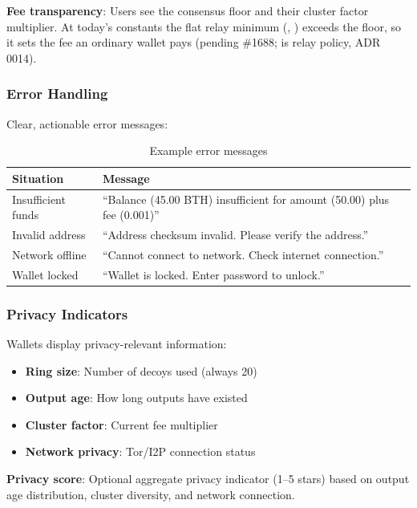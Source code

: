\textbf{Fee transparency}: Users see the consensus floor and their cluster
factor multiplier. At today's constants the flat relay minimum
(, ) exceeds
the floor, so it sets the fee an ordinary wallet pays (pending \#1688;
 is relay policy, ADR 0014).

\subsubsection{Error Handling}

Clear, actionable error messages:

\begin{table}[h]
\centering
\caption{Example error messages}
\label{tab:errors}
\begin{tabular}{@{}p{3.5cm}p{5cm}@{}}
\toprule
\textbf{Situation} & \textbf{Message} \\
\midrule
Insufficient funds & ``Balance (45.00 BTH) insufficient for amount (50.00) plus fee (0.001)'' \\
Invalid address & ``Address checksum invalid. Please verify the address.'' \\
Network offline & ``Cannot connect to network. Check internet connection.'' \\
Wallet locked & ``Wallet is locked. Enter password to unlock.'' \\
\bottomrule
\end{tabular}
\end{table}

\subsubsection{Privacy Indicators}

Wallets display privacy-relevant information:

\begin{itemize}
  \item \textbf{Ring size}: Number of decoys used (always 20)
  \item \textbf{Output age}: How long outputs have existed
  \item \textbf{Cluster factor}: Current fee multiplier
  \item \textbf{Network privacy}: Tor/I2P connection status
\end{itemize}

\textbf{Privacy score}: Optional aggregate privacy indicator (1--5 stars)
based on output age distribution, cluster diversity, and network connection.

